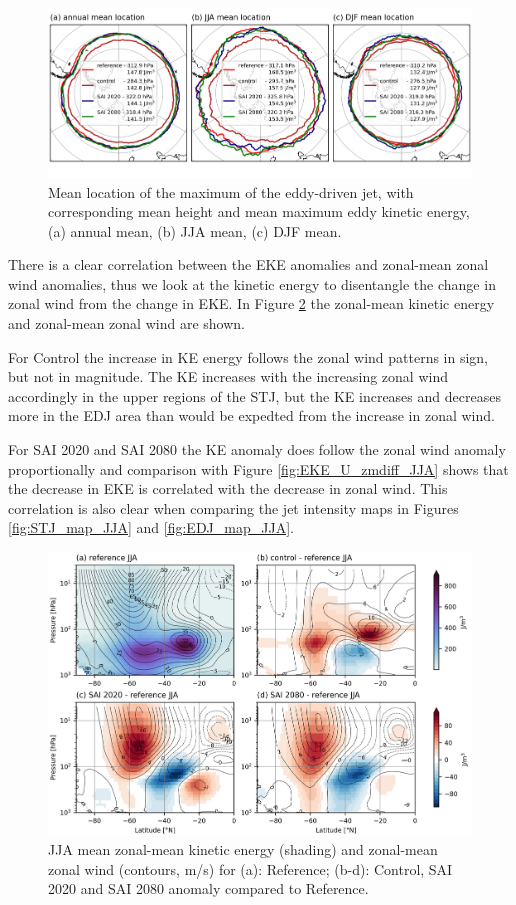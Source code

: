 \begin{figure}[H]
	\centering
	\includegraphics[width=0.95\linewidth]{images/EDJ_maxloc.png}
	\caption{Mean location of the maximum of the eddy-driven jet, with corresponding mean height and mean maximum eddy kinetic energy, (a) annual mean, (b) JJA mean, (c) DJF mean.}
	\label{fig:EDJ_maxloc}
\end{figure}

There is a clear correlation between the EKE anomalies and zonal-mean zonal wind anomalies, thus we look at the kinetic energy to disentangle the change in zonal wind from the change in EKE. In Figure \ref{fig:KE_U_zmdiff_JJA} the zonal-mean kinetic energy and zonal-mean zonal wind are shown. 

For Control the increase in KE energy follows the zonal wind patterns in sign, but not in magnitude. The KE increases with the increasing zonal wind accordingly in the upper regions of the STJ, but the KE increases and decreases more in the EDJ area than would be expedted from the increase in zonal wind. 

For SAI 2020 and SAI 2080 the KE anomaly does follow the zonal wind anomaly proportionally and comparison with Figure \ref{fig:EKE_U_zmdiff_JJA} shows that the decrease in EKE is correlated with the decrease in zonal wind. This correlation is also clear when comparing the jet intensity maps in Figures \ref{fig:STJ_map_JJA} and \ref{fig:EDJ_map_JJA}.

\begin{figure}[H]
	\centering
	\includegraphics[width=0.95\linewidth]{images/KE_U_zmdiff_JJA.png}
	\caption{JJA mean zonal-mean kinetic energy (shading) and zonal-mean zonal wind (contours, m/s) for (a): Reference; (b-d): Control, SAI 2020 and SAI 2080 anomaly compared to Reference.}
	\label{fig:KE_U_zmdiff_JJA}
\end{figure}

